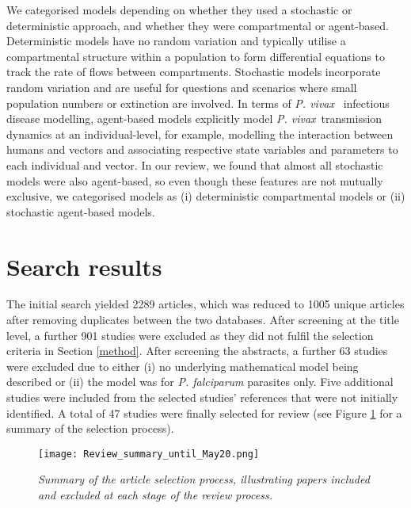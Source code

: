 \documentclass[12pt]{article}
\newcommand{\pv}{\textit{P. vivax}}
\begin{document}
We categorised models depending on whether they used a stochastic or deterministic approach, and whether they were compartmental or agent-based. Deterministic models have no random variation and typically utilise a compartmental structure within a population to form differential equations to track the rate of flows between compartments. Stochastic models incorporate random variation and are useful for questions and scenarios where small population numbers or extinction are involved. In terms of \pv~ infectious disease modelling, agent-based models explicitly model \pv~transmission dynamics at an individual-level, for example, modelling the interaction between humans and vectors and associating respective state variables and parameters to each individual and vector. In our review, we found that almost all stochastic models were also agent-based, so even though these features are not mutually exclusive, we categorised models as (i) deterministic compartmental models or (ii) stochastic agent-based models. 



\section{Search results} \label{ch3/result}
The initial search yielded 2289 articles, which was reduced to 1005 unique articles after removing duplicates between the two databases. After screening at the title level, a further 901 studies were excluded as they did not fulfil the selection criteria in Section \ref{method}. After screening the abstracts, a further 63 studies were excluded due to either (i) no underlying mathematical model being described or (ii) the model was for \textit{P. falciparum} parasites only. Five additional studies were included from the selected studies' references that were not initially identified. A total of 47 studies were finally selected for review (see Figure \ref{fig:review_process} for a summary of the selection process). 

\begin{figure}[h!]
\centering
  \texttt{[image: Review\_summary\_until\_May20.png]} 
  \caption{\textit{Summary of the article selection process, illustrating papers included and excluded at each stage of the review process.}}
  \label{fig:review_process}
\end{figure}
\end{document}
